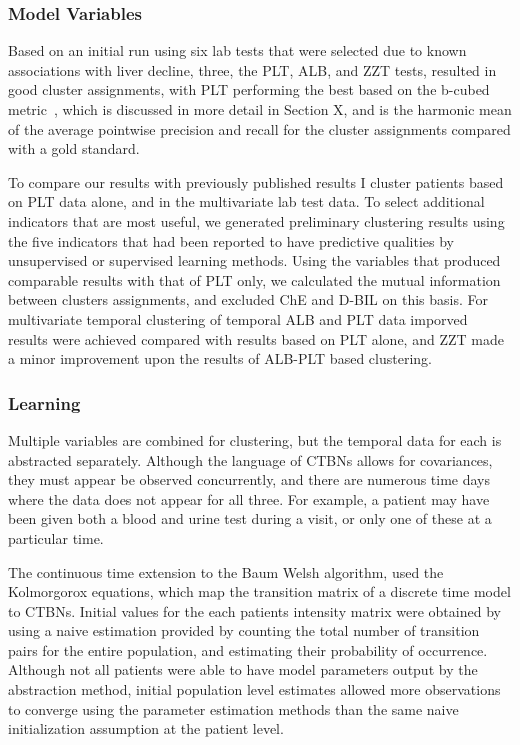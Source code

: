 \subsubsection{Model Variables}
Based on an initial run using six lab tests that were selected due to known associations with liver decline, three, the PLT, ALB, and ZZT tests, resulted in good cluster assignments, with PLT performing the best based on the b-cubed metric~\cite{Bagga}, which is discussed in more detail in Section X, and is the harmonic mean of the average pointwise precision and recall for the cluster assignments compared with a gold standard.

To compare our results with previously published results I cluster patients based on PLT data alone, and in the multivariate lab test data.  To select additional indicators that are most useful, we generated preliminary clustering results using the five indicators that had been reported to have predictive qualities by unsupervised or supervised learning methods.  Using the variables that produced comparable results with that of PLT only, we calculated the mutual information between clusters assignments, and excluded ChE and D-BIL on this basis.  For multivariate temporal clustering of temporal ALB and PLT  data imporved results were achieved compared with results based on PLT alone, and ZZT made a minor improvement upon the results of ALB-PLT based clustering.

\subsubsection{Learning}
Multiple variables are combined for clustering, but the temporal data for each is abstracted separately.  Although the language of CTBNs allows for covariances, they must appear be observed concurrently, and there are numerous time days where the data does not appear for all three.  For example, a patient may have been given both a blood and urine test during a visit, or only one of these at a particular time.


The continuous time extension to the Baum Welsh algorithm, used the Kolmorgorox equations, which map the transition matrix of a discrete time model to CTBNs. Initial values for the each patients intensity matrix were obtained by using a naive estimation provided by counting the total number of transition pairs for the entire population, and estimating their probability of occurrence. Although not all patients were able to have model parameters output by the abstraction method, initial population level estimates allowed more observations to converge using the parameter estimation methods than the same naive initialization assumption at the patient level.

